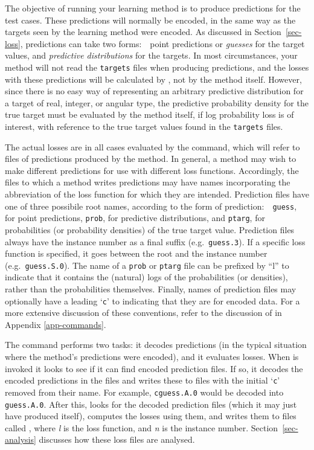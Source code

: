 The objective of running your learning method is to produce
predictions for the test cases.  These predictions will normally be
encoded, in the same way as the targets seen by the learning method
were encoded.  As discussed in Section~\ref{sec-loss}, predictions can
take two forms:\ \ point predictions or \emph{guesses} for the target
values, and \emph{predictive distributions} for the targets.  In most
circumstances, your method will not read the \texttt{targets} files
when producing predictions, and the losses with these predictions will
be calculated by \delve{}, not by the method itself.  However, since
there is no easy way of representing an arbitrary predictive
distribution for a target of real, integer, or angular type, the
predictive probability density for the true target must be evaluated
by the method itself, if log probability loss is of interest, with
reference to the true target values found in the \texttt{targets}
files.

The actual losses are in all cases evaluated by the \mloss{} command,
which will refer to files of predictions produced by the method.  In
general, a method may wish to make different predictions for use with
different loss functions.  Accordingly, the files to which a method
writes predictions may have names incorporating the abbreviation of
the loss function for which they are intended.  Prediction files have
one of three possibile root names, according to the form of
prediction:\ \ \texttt{guess}, for point predictions, \texttt{prob},
for predictive distributions, and \texttt{ptarg}, for probabilities
(or probability densities) of the true target value.  Prediction files
always have the instance number as a final suffix
(e.g.~\texttt{guess.3}).  If a specific loss function is specified, it
goes between the root and the instance number
(e.g.~\texttt{guess.S.0}).  The name of a \texttt{prob} or
\texttt{ptarg} file can be prefixed by ``l'' to indicate that it
contains the (natural) logs of the probabilities (or densities),
rather than the probabilities themselves.  Finally, names of
prediction files may optionally have a leading `\texttt{c}' to
indicating that they are for encoded data. For a more extensive
discussion of these conventions, refer to the discussion of \mloss{}
in Appendix \ref{app-commands}.

The \mloss{} command performs two tasks: it decodes predictions (in
the typical situation where the method's predictions were encoded),
and it evaluates losses.  When \mloss{} is invoked it looks to see if
it can find encoded prediction files. If so, it decodes the encoded
predictions in the files and writes these to files with the initial
`\texttt{c}' removed from their name. For example, \texttt{cguess.A.0}
would be decoded into \texttt{guess.A.0}.  After this, \mloss{} looks
for the decoded prediction files (which it may just have produced
itself), computes the losses using them, and writes them to files
called , where \textit{l} is the loss function, and
\textit{n} is the instance number.  Section~\ref{sec-analysis}
discusses how these loss files are analysed.

